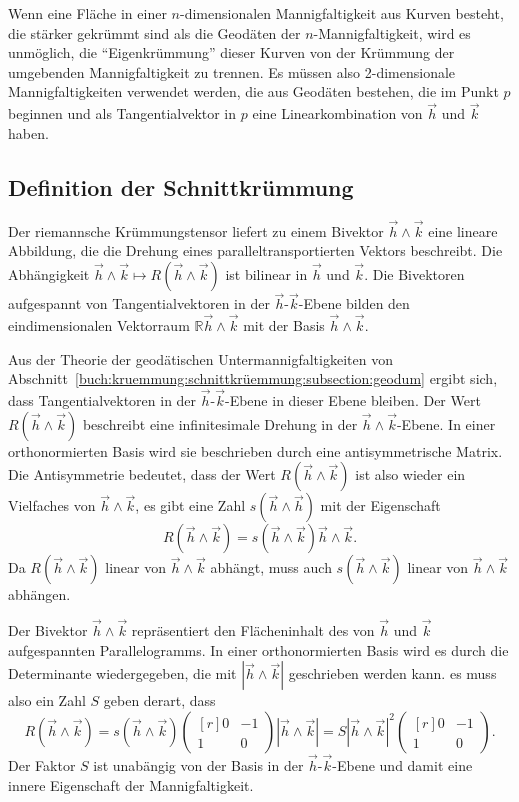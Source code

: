 Wenn eine Fläche in einer $n$-dimensionalen Mannigfaltigkeit aus
Kurven besteht, die stärker gekrümmt sind als die Geodäten 
der $n$-Mannigfaltigkeit, wird es unmöglich, die ``Eigenkrümmung''
dieser Kurven von der Krümmung der umgebenden Mannigfaltigkeit
zu trennen.
Es müssen also 2-dimensionale Mannigfaltigkeiten verwendet werden, 
die aus Geodäten bestehen, die im Punkt $p$ beginnen und als
Tangentialvektor in $p$ eine Linearkombination von $\vec{h}$ und
$\vec{k}$ haben.

%
%
\subsection{Definition der Schnittkrümmung}
Der riemannsche Krümmungstensor liefert zu einem Bivektor
$\vec{h}\wedge\vec{k}$ eine lineare Abbildung, die die Drehung
eines paralleltransportierten Vektors beschreibt.
Die Abhängigkeit $\vec{h}\wedge\vec{k}\mapsto R(\vec{h}\wedge\vec{k})$
ist bilinear in $\vec{h}$ und $\vec{k}$.
Die Bivektoren aufgespannt von Tangentialvektoren in der
$\vec{h}$-$\vec{k}$-Ebene bilden den eindimensionalen Vektorraum
$\mathbb{R}\vec{h}\wedge\vec{k}$ mit der Basis $\vec{h}\wedge\vec{k}$.

Aus der Theorie der geodätischen Untermannigfaltigkeiten von
Abschnitt~\ref{buch:kruemmung:schnittkrüemmung:subsection:geodum}
ergibt sich, dass Tangentialvektoren in der $\vec{h}$-$\vec{k}$-Ebene
in dieser Ebene bleiben.
Der Wert $R(\vec{h}\wedge\vec{k})$ beschreibt eine infinitesimale Drehung
in der $\vec{h}\wedge\vec{k}$-Ebene.
In einer orthonormierten Basis wird sie beschrieben durch eine
antisymmetrische Matrix.
Die Antisymmetrie bedeutet, dass der Wert $R(\vec{h}\wedge\vec{k})$ ist
also wieder ein Vielfaches von $\vec{h}\wedge\vec{k}$, es gibt
eine Zahl $s(\vec{h}\wedge\vec{h})$ mit der Eigenschaft
\[
R(\vec{h}\wedge\vec{k})
=
s(\vec{h}\wedge\vec{k})
\vec{h}\wedge\vec{k}.
\]
Da $R(\vec{h}\wedge\vec{k})$ linear von $\vec{h}\wedge\vec{k}$ abhängt,
muss auch $s(\vec{h}\wedge\vec{k})$ linear von $\vec{h}\wedge\vec{k}$
abhängen.

Der Bivektor $\vec{h}\wedge\vec{k}$ repräsentiert den Flächeninhalt
des von $\vec{h}$ und $\vec{k}$ aufgespannten Parallelogramms. 
In einer orthonormierten Basis wird es durch die Determinante wiedergegeben,
die mit $|\vec{h}\wedge\vec{k}|$ geschrieben werden kann.
es muss also ein Zahl $S$ geben derart, dass
\[
R(\vec{h}\wedge\vec{k})
=
s(\vec{h}\wedge\vec{k})
\begin{pmatrix*}[r] 0&-1\\ 1&0\end{pmatrix*}
|\vec{h}\wedge\vec{k}|
=
S |\vec{h}\wedge\vec{k}|^2
\begin{pmatrix*}[r] 0&-1\\1&0\end{pmatrix*}.
\]
Der Faktor $S$ ist unabängig von der Basis in der $\vec{h}$-$\vec{k}$-Ebene
und damit eine innere Eigenschaft der Mannigfaltigkeit.


